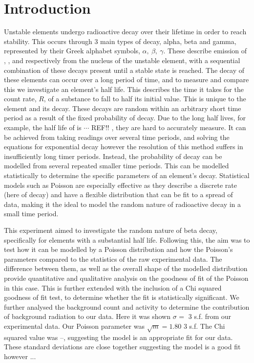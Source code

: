 \documentclass[11pt]{article}
\begin{document}
    \section{Introduction}
    Unstable elements undergo radioactive decay over their lifetime in order to reach stability. This occurs through 3 main types of decay, alpha, beta and gamma, represented by their Greek alphabet symbols, $\alpha,\  \beta,\ \gamma$.  These describe emission of , , and  respectively from the nucleus of the unstable element, with a sequential combination of these decays present until a stable state is reached. The decay of these elements can occur over a long period of time, and to measure and compare this we investigate an element's half life. This describes the time it takes for the count rate, $R$, of a substance to fall to half its initial value. This is unique to the element and its decay.
    These decays are random within an arbitrary short time period as a result of the fixed probability of decay. Due to the long half lives, for example, the half life of  is $\cdots$ REF!! , they are hard to accurately measure.  It can be achieved from taking readings over several time periods, and solving the equations for exponential decay however the resolution of this method suffers in insufficiently long timer periods. Instead, the probability of decay can be modelled from several repeated smaller time periods. This can be modelled statistically to determine the  specific parameters of an element's decay. Statistical models such as Poisson are especially effective as they describe a discrete rate (here of decay) and have a flexible distribution that can be fit to a spread of data, making it the ideal to model the random nature of radioactive decay in a small time period. 
    
    This experiment aimed to investigate the random nature of beta decay, specifically for elements with a substantial half life. Following this, the aim was to test how it can be modelled by a Poisson distribution and how the Poisson's parameters compared to the statistics of the raw experimental data. The difference between them, as well as the overall shape of the modelled distribution provide quantitative and qualitative analysis on the goodness of fit of the Poisson in this case. This is further extended with the inclusion of a Chi squared goodness of fit test, to determine whether the fit is statistically significant.  We further analysed the background count and activity to determine the contribution of background radiation to our data. 
    Here it was shown $\sigma_{} = $ 3 s.f. from our experimental data. Our Poisson parameter was $\sqrt{m} = 1.80$ 3 s.f. The Chi squared value was --, suggesting the model is an appropriate fit for our data. These standard deviations are close together suggesting the model is a good fit however ...
\end{document}
